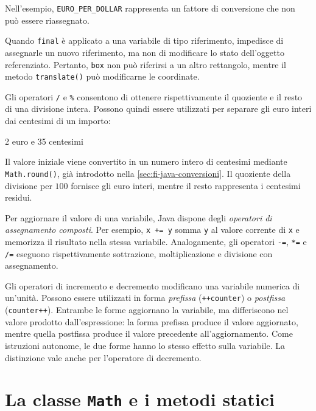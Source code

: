 Nell'esempio, \texttt{EURO\_PER\_DOLLAR} rappresenta
un fattore di conversione che non può essere riassegnato.

Quando \texttt{final} è applicato a una variabile di
tipo riferimento, impedisce di assegnarle un nuovo riferimento,
ma non di modificare lo stato dell'oggetto referenziato.
Pertanto, \texttt{box} non può riferirsi a un altro
rettangolo, mentre il metodo \texttt{translate()}
può modificarne le coordinate.

Gli operatori \texttt{/} e \texttt{\%} consentono
di ottenere rispettivamente il quoziente e il resto
di una divisione intera. Possono quindi essere utilizzati
per separare gli euro interi dai centesimi di un importo:



\begin{unipdterminal}
2 euro e 35 centesimi
\end{unipdterminal}

Il valore iniziale viene convertito in un numero intero
di centesimi mediante \texttt{Math.round()}, già introdotto
nella \cref{sec:fi-java-conversioni}. Il quoziente della
divisione per \(100\) fornisce gli euro interi, mentre
il resto rappresenta i centesimi residui.

Per aggiornare il valore di una variabile, Java dispone
degli \emph{operatori di assegnamento composti}.
Per esempio, \texttt{x += y} somma \texttt{y} al valore
corrente di \texttt{x} e memorizza il risultato nella
stessa variabile. Analogamente, gli operatori
\texttt{-=}, \texttt{*=} e \texttt{/=} eseguono
rispettivamente sottrazione, moltiplicazione e divisione
con assegnamento.

Gli operatori di incremento e decremento modificano
una variabile numerica di un'unità. Possono essere
utilizzati in forma \emph{prefissa}
(\texttt{++counter}) o \emph{postfissa}
(\texttt{counter++}). Entrambe le forme aggiornano
la variabile, ma differiscono nel valore prodotto
dall'espressione: la forma prefissa produce il
valore aggiornato, mentre quella postfissa produce
il valore precedente all'aggiornamento.
Come istruzioni autonome, le due forme hanno lo stesso
effetto sulla variabile. La distinzione vale anche
per l'operatore di decremento.

\clearpage

\section{La classe \texttt{Math} e i metodi statici}
\label{sec:fi-java-math}

